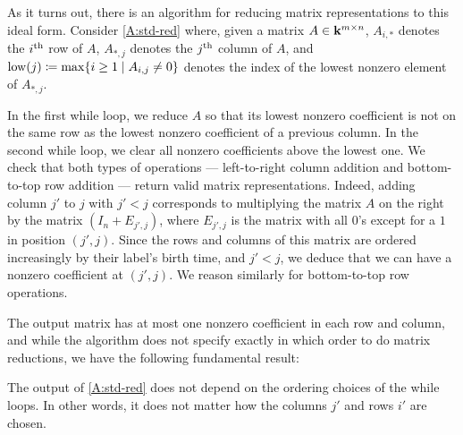 As it turns out, there is an algorithm for reducing matrix representations to this ideal form. Consider \cref{A:std-red} where, given a matrix $A \in \mathbf{k}^{m \times n}$, $A_{i, *}$ denotes the $i^{\text{th}}$ row of $A$, $A_{*, j}$ denotes the $j^{\text{th}}$ column of $A$, and $\operatorname{low}(j) \coloneq \max\{i \geq 1 \mid A_{i, j} \neq 0\}$ denotes the index of the lowest nonzero element of $A_{*, j}$.

\begin{algorithm}[tbp]
\caption{Standard reduction algorithm.}
\label{A:std-red}

\end{algorithm}

In the first while loop, we reduce $A$ so that its lowest nonzero coefficient is not on the same row as the lowest nonzero coefficient of a previous column. In the second while loop, we clear all nonzero coefficients above the lowest one. We check that both types of operations --- left-to-right column addition and bottom-to-top row addition --- return valid matrix representations. Indeed, adding column $j'$ to $j$ with $j' < j$ corresponds to multiplying the matrix $A$ on the right by the matrix $(I_n + E_{j', j})$, where $E_{j', j}$ is the matrix with all $0$'s except for a $1$ in position $(j' ,j)$. Since the rows and columns of this matrix are ordered increasingly by their label's birth time, and $j' < j$, we deduce that we can have a nonzero coefficient at $(j', j)$. We reason similarly for bottom-to-top row operations.

The output matrix has at most one nonzero coefficient in each row and column, and while the algorithm does not specify exactly in which order to do matrix reductions, we have the following fundamental result:

\begin{theorem}
  The output of \cref{A:std-red} does not depend on the ordering choices of the while loops. In other words, it does not matter how the columns $j'$ and rows $i'$ are chosen.
\end{theorem}

